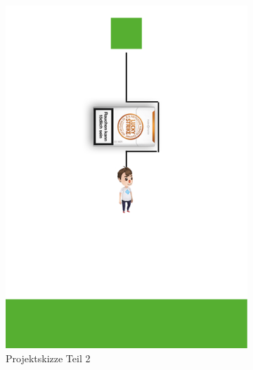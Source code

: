 \begin{figure}[H]
\begin{subfigure}[b]{0.3\textwidth}
        \includegraphics[width=\textwidth]{assets/skizze2.png}
        \caption{Projektskizze Teil 2}
        \label{fig:skizze2}
    \end{subfigure}
    ~
    \begin{subfigure}[b]{0.3\textwidth}

\end{subfigure}
\end{figure}
